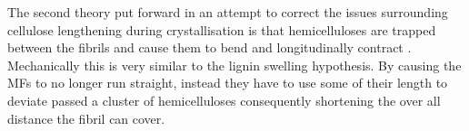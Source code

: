The second theory put forward in an attempt to correct the issues surrounding
cellulose lengthening during crystallisation is that 
hemicelluloses are trapped between the fibrils and cause them to bend and longitudinally contract \cite{Mellerowicz_2008}. Mechanically this is very similar
to the lignin swelling hypothesis. By causing the MFs to no longer run straight,
instead they have to use some of their length to deviate passed a cluster of
hemicelluloses consequently shortening the over all distance the fibril can
cover. 